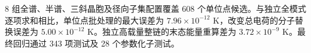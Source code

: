8 组全谱、半谱、三斜晶胞及径向子集配置覆盖 608 个单位点候选。与独立全模式逐项求和相比，单位点批处理的最大误差为 $7.96\times 10^{-12}$ K，改变总电荷的分子替换误差为 $5.00\times 10^{-12}$ K。独立高载量整链的末态能量重算差为 $3.72\times 10^{-9}$ K。最终回归通过 343 项测试及 28 个参数化子测试。
